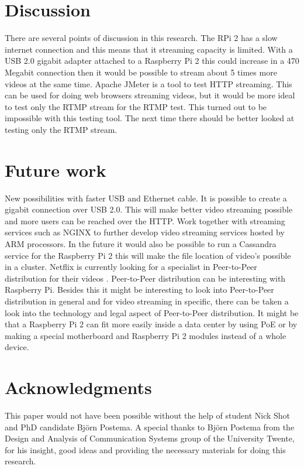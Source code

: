 \documentclass{sig-alternate-br}
\begin{document}
\section{Discussion}

There are several points of discussion in this research. The RPi 2 has a slow internet connection and this means that it streaming capacity is limited. With a USB 2.0 gigabit adapter attached to a Raspberry Pi 2 this could increase in a 470 Megabit connection then it would be possible to stream about 5 times more videos at the same time. \newline
Apache JMeter is a tool to test HTTP streaming. This can be used for doing web browsers streaming videos, but it would be more ideal to test only the RTMP stream for the RTMP test.  This turned out to be impossible with this testing tool. The next time there should be better looked at testing only the RTMP stream. 
 
\section{Future work}
New possibilities with faster USB and Ethernet cable. It is possible to create a gigabit connection over USB 2.0. This will make better video streaming possible and more users can be reached over the HTTP. Work together with streaming services such as NGINX to further develop video streaming services hosted by ARM processors. In the future it would also be possible to run a Cassandra service for the Raspberry Pi 2 this will make the file location of video's possible in a cluster. Netflix is currently looking for a specialist in  Peer-to-Peer distribution for their videos \cite{netflix}.  Peer-to-Peer distribution can be interesting with Raspberry Pi. Besides this it might be interesting to look into Peer-to-Peer distribution in general and for video streaming in specific, there can be taken a look into the technology and legal aspect of  Peer-to-Peer distribution. It might be that a Raspberry Pi 2 can fit more easily inside a data center by using PoE or by making a special motherboard and Raspberry Pi 2 modules instead of a whole device. 

\section{Acknowledgments}
This paper would not have been possible without the help of  student Nick Shot and PhD candidate Björn Postema. A special thanks to Björn Postema from the Design and Analysis of Communication Systems group of the University Twente, for his insight, good ideas and providing the necessary materials for doing this research.
\end{document}
